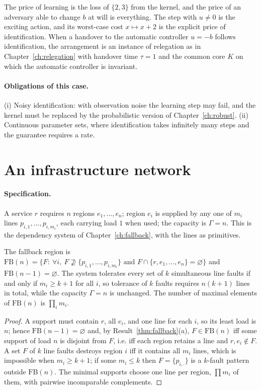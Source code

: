 The price of learning is the loss of $\{2,3\}$ from the kernel, and the price of an adversary able to change $b$ at will is everything. The step with $u\ne0$ is the exciting action, and its worst-case cost $x\mapsto x+2$ is the explicit price of identification. When a handover to the automatic controller $u=-b$ follows identification, the arrangement is an instance of relegation as in Chapter~\ref{ch:relegation} with handover time $\tau=1$ and the common core $K$ on which the automatic controller is invariant.

\paragraph{Obligations of this case.} (i) Noisy identification: with observation noise the learning step may fail, and the kernel must be replaced by the probabilistic version of Chapter~\ref{ch:robust}. (ii) Continuous parameter sets, where identification takes infinitely many steps and the guarantee requires a rate.

\section{An infrastructure network}

\paragraph{Specification.} A service $r$ requires $n$ regions $e_1,\dots,e_n$; region $e_i$ is supplied by any one of $m_i$ lines $p_{i,1},\dots,p_{i,m_i}$, each carrying load $1$ when used; the capacity is $\Gamma=n$. This is the dependency system of Chapter~\ref{ch:fallback}, with the lines as primitives.

\begin{newresult}\label{prop:network}
The fallback region is $\mathrm{FB}(n)=\{F:\ \forall i,\ F\not\supseteq\{p_{i,1},\dots,p_{i,m_i}\}\text{ and }F\cap\{r,e_1,\dots,e_n\}=\varnothing\}$ and $\mathrm{FB}(n-1)=\varnothing$. The system tolerates every set of $k$ simultaneous line faults if and only if $m_i\ge k+1$ for all $i$, so tolerance of $k$ faults requires $n(k+1)$ lines in total, while the capacity $\Gamma=n$ is unchanged. The number of maximal elements of $\mathrm{FB}(n)$ is $\prod_im_i$.
\end{newresult}
\begin{proof}
A support must contain $r$, all $e_i$, and one line for each $i$, so its least load is $n$; hence $\mathrm{FB}(n-1)=\varnothing$ and, by Result~\ref{thm:fallback}(a), $F\in\mathrm{FB}(n)$ iff some support of load $n$ is disjoint from $F$, i.e. iff each region retains a line and $r,e_i\notin F$. A set $F$ of $k$ line faults destroys region $i$ iff it contains all $m_i$ lines, which is impossible when $m_i\ge k+1$; if some $m_i\le k$ then $F=\{p_{i,\cdot}\}$ is a $k$-fault pattern outside $\mathrm{FB}(n)$. The minimal supports choose one line per region, $\prod m_i$ of them, with pairwise incomparable complements.
\end{proof}

